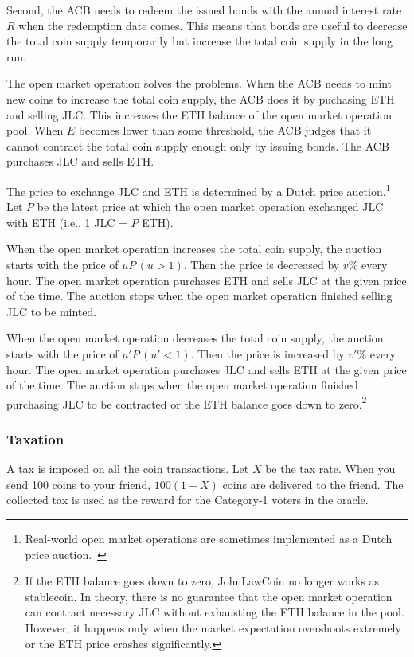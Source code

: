 \documentclass[dvipdfmx,a4paper]{article}
\begin{document}
Second, the ACB needs to redeem the issued bonds with the annual interest rate $R$ when the redemption date comes. This means that bonds are useful to decrease the total coin supply temporarily but increase the total coin supply in the long run.

The open market operation solves the problems. When the ACB needs to mint new coins to increase the total coin supply, the ACB does it by puchasing ETH and selling JLC. This increases the ETH balance of the open market operation pool. When $E$ becomes lower than some threshold, the ACB judges that it cannot contract the total coin supply enough only by issuing bonds. The ACB purchases JLC and sells ETH.

The price to exchange JLC and ETH is determined by a Dutch price auction.\footnote{Real-world open market operations are sometimes implemented as a Dutch price auction.~\cite{ayuso2003model}} Let $P$ be the latest price at which the open market operation exchanged JLC with ETH (i.e., 1 JLC = $P$ ETH).

When the open market operation increases the total coin supply, the auction starts with the price of $uP\,(u>1)$. Then the price is decreased by $v$\% every hour. The open market operation purchases ETH and sells JLC at the given price of the time. The auction stops when the open market operation finished selling JLC to be minted.

When the open market operation decreases the total coin supply, the auction starts with the price of $u'P\,(u'<1)$. Then the price is increased by $v'$\% every hour. The open market operation purchases JLC and sells ETH at the given price of the time. The auction stops when the open market operation finished purchasing JLC to be contracted or the ETH balance goes down to zero.\footnote{If the ETH balance goes down to zero, JohnLawCoin no longer works as stablecoin. In theory, there is no guarantee that the open market operation can contract necessary JLC without exhausting the ETH balance in the pool. However, it happens only when the market expectation overshoots extremely or the ETH price crashes significantly.}

\subsubsection{Taxation}

A tax is imposed on all the coin transactions. Let $X$ be the tax rate. When you send 100 coins to your friend, $100(1-X)$ coins are delivered to the friend. The collected tax is used as the reward for the Category-1 voters in the oracle.
\end{document}
